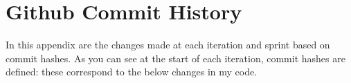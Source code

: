 \chapter{Github Commit History}

In this appendix are the changes made at each iteration and sprint based on commit hashes. As you can see at the start of each iteration, commit hashes are defined: these correspond to the below changes in my code.